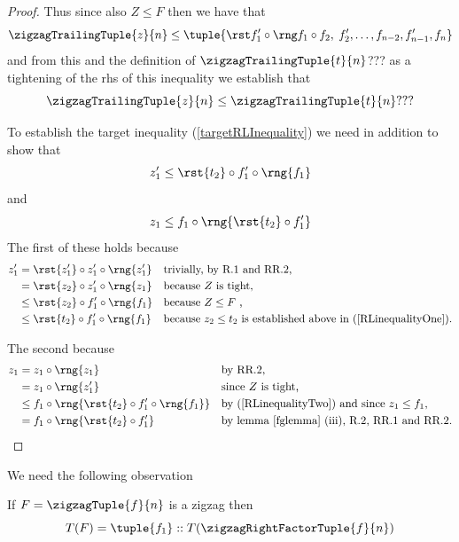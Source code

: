\begin{proof}
Thus since also $Z \leq F$ then we have that
\[
\zigzagTrailingTuple{z}{n} \leq \tuple{\tightTail}
\] 
and from this and the definition of $\zigzagTrailingTuple{t}{n}$???
as a tightening of the rhs of this inequality we establish that
\[
\label{RLinequalityOne}
\zigzagTrailingTuple{z}{n} \leq \zigzagTrailingTuple{t}{n} ???
\]

To establish the target inequality (\ref{targetRLInequality})
we need 
in addition to show that
 \begin{equation}
 \label{RLinequalityTwo}
 z'_1 \leq  \rst{t_2} \circ f'_1 \circ \rng{f_1}
 \end{equation}
 and
  \begin{equation}
 \label{RLinequalityThree}
 z_1 \leq f_1 \circ \rng{\rst{t_2} \circ f'_1}
 \end{equation}
The first of these holds because
\begin{align*}
z'_1 &= \rst{z'_1} \circ z'_1  \circ \rng{z'_1} 
                && \mbox{trivially, by R.1 and RR.2,}\\
         &= \rst{z_2} \circ z'_1  \circ \rng{z_1} 
         &&\mbox{because $Z$ is tight,}\\
         &\leq \rst{z_2} \circ f'_1  \circ \rng{f_1}
         &&\mbox{because $Z \leq F$ ,}\\
         &\leq \rst{t_2} \circ f'_1  \circ \rng{f_1}
         &&\mbox{because $z_2 \leq t_2$ is established
                               above in (\ref{RLinequalityOne}).}
\end{align*}

The second because
\begin{align*}
z_1 &= z_1 \circ \rng{z_1}
        && \mbox{by RR.2,} \\ 
    &= z_1 \circ \rng{z'_1}
        && \mbox{since $Z$ is tight,} \\ 
    &\leq f_1 \circ \rng{\rst{t_2} \circ f'_1 \circ \rng{f_1}}
        && \mbox{by (\ref{RLinequalityTwo}) and since $z_1 \leq f_1$,} \\ 
    &= f_1 \circ \rng{\rst{t_2} \circ f'_1}
        && \mbox{by lemma \ref{fglemma} (iii), R.2, RR.1  and RR.2.}
\end{align*}
\end{proof} %

We  need the following observation
\begin{observation}
If $F=\zigzagTuple{f}{n}$ is a zigzag then
\[
T(F) =  \tuple{f_1} :: T(\zigzagRightFactorTuple{f}{n}) 
\] 
\end{observation}

